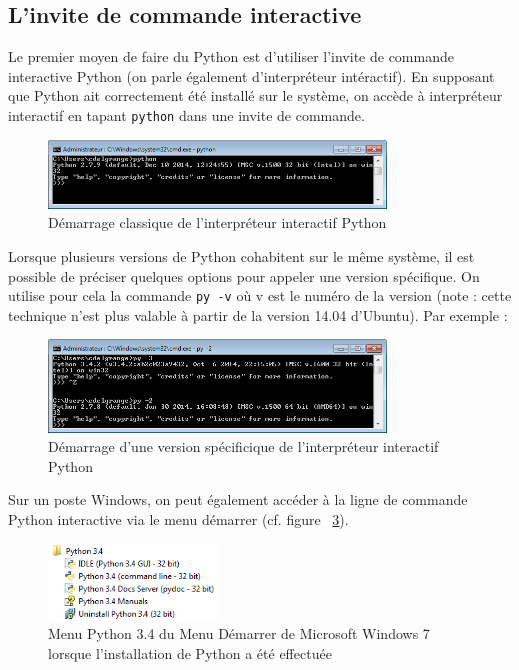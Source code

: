 \documentclass[12pt, a4paper]{article}
\begin{document}
\subsection{L'invite de commande interactive}
Le premier moyen de faire du Python est d'utiliser l'invite de commande interactive Python (on parle également d'interpréteur intéractif). En supposant que Python ait correctement été installé sur le système, on accède à interpréteur interactif en tapant \lstinline{python} dans une invite de commande.

\begin{figure}[H]
	\center \includegraphics[width=0.8\textwidth]{img/demarrer_session_interactive-1.png}
	\caption{Démarrage classique de l'interpréteur interactif Python}
	\label{demarrer_session-1}
\end{figure}

Lorsque plusieurs versions de Python cohabitent sur le même système, il est possible de préciser quelques options pour appeler une version spécifique. On utilise pour cela la commande \lstinline{py -v} où v est le numéro de la version (note : cette technique n'est plus valable à partir de la version 14.04 d'Ubuntu). Par exemple :

\begin{figure}[H]
	\center \includegraphics[width=0.8\textwidth]{img/demarrer_session_interactive-2.png}
	\caption{Démarrage d'une version spécificique de l'interpréteur interactif Python}
	\label{demarrer_session-2}
\end{figure}

Sur un poste Windows, on peut également accéder à la ligne de commande Python interactive via le menu démarrer (cf. figure ~\ref{menu_python}).

\begin{figure}[H]
	\center \includegraphics[width=0.4\textwidth]{img/menu_python.png}
	\caption{Menu Python 3.4 du Menu Démarrer de Microsoft Windows 7 lorsque l'installation de Python a été effectuée}
	\label{menu_python}
\end{figure}
\end{document}

